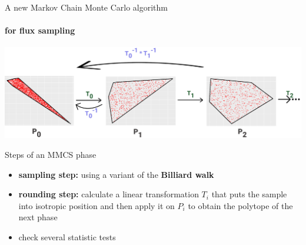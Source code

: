 \documentclass{beamer}
\begin{document}
   \begin{frame}{A new Markov Chain Monte Carlo algorithm}
      \framesubtitle{for flux sampling}

      \includegraphics[scale=0.11]{ ../met_nets/resources/sampling_extra_phase_croped_transparent.png}
      
      \scriptsize
      \begin{block}{Steps of an MMCS phase}
         \begin{itemize}
            \item \textbf{sampling step:} using a variant of the \textbf{Billiard walk}  
            \item \textbf{rounding step:} calculate a linear transformation $T_i$ that puts the sample into isotropic position and then apply it on $P_i$ to obtain the polytope of the next phase
            \item check several statistic tests
         \end{itemize}      

      \end{block}

   

   \end{frame}
\end{document}

